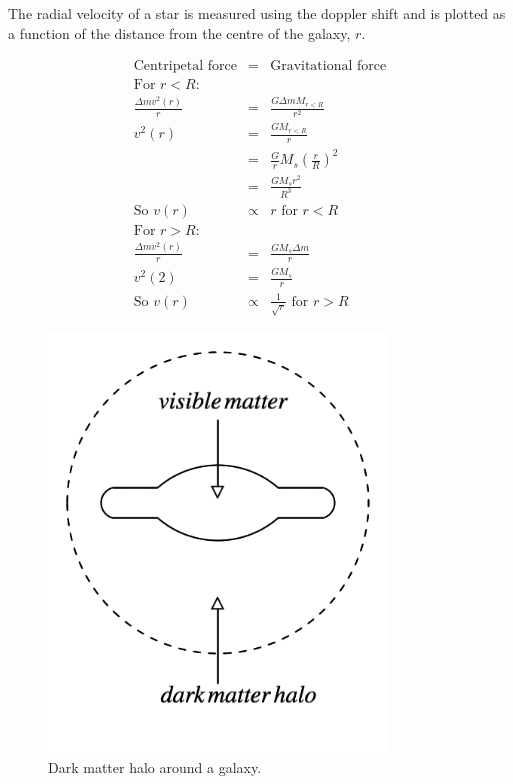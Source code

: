 The radial velocity of a star is measured using the doppler shift and is plotted as a function of the distance from the centre of the galaxy, $r$.

\begin{eqnarray*}
  \textrm{Centripetal force} & = & \textrm{Gravitational force} \\
  \textrm{For } r<R : && \\
  \frac{\Delta m v^2(r)}{r} & = & \frac{G \Delta m M_{r<R}}{r^2} \\
  v^2(r) & = & \frac{GM_{r<R}}{r} \\
  & = & \frac{G}{r}M_s \left( \frac{r}{R} \right)^2 \\
  & = & \frac{GM_sr^2}{R^3} \\
  \textrm{So } v(r) & \propto & r \textrm{ for } r<R \\
  \textrm{For } r>R: && \\
  \frac{\Delta m v^2(r)}{r} & = & \frac{GM_s \Delta m}{r} \\
  v^2(2) & = & \frac{GM_s}{r} \\
  \textrm{So } v(r) & \propto & \frac{1}{\sqrt{r}} \textrm{ for } r>R
\end{eqnarray*}

\begin{figure}[!htb]
  \begin{center}
    \includegraphics[width=0.8\textwidth]{images/web_feynman/image_88.png}
    \caption[Dark matter halo around a galaxy]{Dark matter halo around a galaxy.}
    \label{fig:ch1_darkMatterHalo}
  \end{center}
\end{figure}

